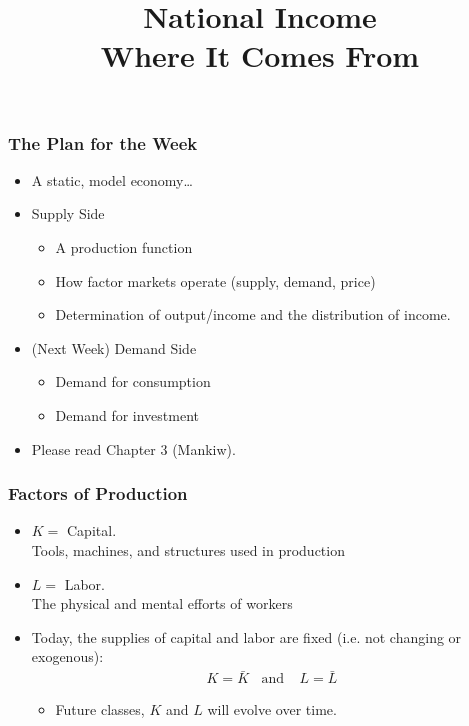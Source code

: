 \documentclass[handout]{beamer}
\title[NYU Stern] %
{\Large National Income \\ \medskip \Large Where It Comes From}
\author[Michael Waugh] %
{\bf{\Large}}%
\date[] %
\begin{document}
%
%

\begin{frame}
  \titlepage
\end{frame}

%
%
\begin{frame}[t]
\frametitle{The Plan for the Week}
\begin{itemize}
\item A static, model economy\ldots
\bigskip
\item Supply Side
\begin{itemize}
\medskip
\item A production function
\medskip
\item How factor markets operate (supply, demand, price)
\medskip
\item Determination of output/income and the distribution of income.
\end{itemize}
\bigskip
\item (Next Week) Demand Side
\begin{itemize}
\medskip
\item Demand for consumption
\medskip
\item Demand for investment
\end{itemize}
\bigskip
\item Please read Chapter 3 (Mankiw).
\end{itemize}
\bigskip
\end{frame}


\begin{frame}[t]
\frametitle{Factors of Production}
\begin{itemize}
\item $K  =$ Capital. \\
\medskip
Tools, machines, and structures used in production
\bigskip
\item $L  =$ Labor. \\
\medskip
The physical and mental efforts of workers
\bigskip
\item Today, the supplies of capital and labor are fixed (i.e. not changing or exogenous):
\begin{eqnarray*}
K = \bar K \ \ \ \ \mbox{and} \ \ \ \ \ L = \bar L
\end{eqnarray*}
\begin{itemize}
\medskip
\item Future classes, $K$ and $L$ will evolve over time.
\end{itemize}
\end{itemize}
\end{frame}
\end{document}

